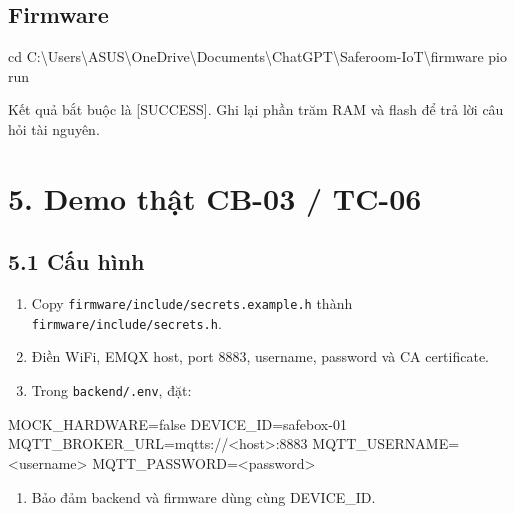 \documentclass[11pt,oneside,openany]{book}
\renewcommand{\texttt}[1]{{\ttfamily\small #1}}
\newenvironment{Shaded}{\begin{snugshade}}{\end{snugshade}}
\newcommand{\FunctionTok}[1]{\textcolor[rgb]{0.56,0.27,0.68}{#1}}
\newcommand{\NormalTok}[1]{\textcolor[rgb]{0.81,0.81,0.76}{#1}}
\newcommand{\OperatorTok}[1]{\textcolor[rgb]{0.81,0.81,0.76}{#1}}
\renewenvironment{Shaded}{%
  \def\FrameCommand{\fboxsep=8pt\colorbox{shadecolor}}%
  \MakeFramed{\advance\hsize-\width\FrameRestore}%
}{\endMakeFramed}
\providecommand{\tightlist}{\setlength{\itemsep}{1pt}\setlength{\parskip}{0pt}}
\begin{document}
\subsection{Firmware}\label{firmware}

\begin{Shaded}
\begin{Highlighting}[]
\FunctionTok{cd}\NormalTok{ C}\OperatorTok{:}\NormalTok{\textbackslash{}Users\textbackslash{}ASUS\textbackslash{}OneDrive\textbackslash{}Documents\textbackslash{}ChatGPT\textbackslash{}Saferoom{-}IoT\textbackslash{}firmware}
\NormalTok{pio run}
\end{Highlighting}
\end{Shaded}

Kết quả bắt buộc là \texttt{{[}SUCCESS{]}}. Ghi lại phần trăm RAM và
flash để trả lời câu hỏi tài nguyên.

\section{5. Demo thật CB-03 /
TC-06}\label{5-demo-thux1eadt-cb-03--tc-06}

\subsection{5.1 Cấu hình}\label{51-cux1ea5u-huxecnh}

\begin{enumerate}
\def\labelenumi{\arabic{enumi}.}
\tightlist
\item
  Copy \nolinkurl{firmware/include/secrets.example.h} thành
  \nolinkurl{firmware/include/secrets.h}.
\item
  Điền WiFi, EMQX host, port 8883, username, password và CA certificate.
\item
  Trong \nolinkurl{backend/.env}, đặt:
\end{enumerate}

\begin{Shaded}
\begin{Highlighting}[]
\NormalTok{MOCK\_HARDWARE=false}
\NormalTok{DEVICE\_ID=safebox{-}01}
\NormalTok{MQTT\_BROKER\_URL=mqtts://\textless{}host\textgreater{}:8883}
\NormalTok{MQTT\_USERNAME=\textless{}username\textgreater{}}
\NormalTok{MQTT\_PASSWORD=\textless{}password\textgreater{}}
\end{Highlighting}
\end{Shaded}

\begin{enumerate}
\def\labelenumi{\arabic{enumi}.}
\setcounter{enumi}{3}
\tightlist
\item
  Bảo đảm backend và firmware dùng cùng \texttt{DEVICE\_ID}.
\end{enumerate}
\end{document}
